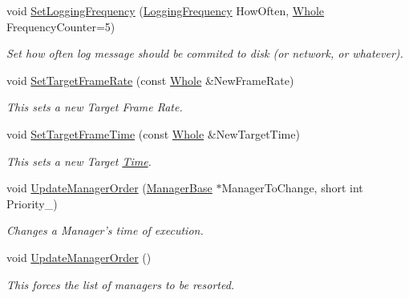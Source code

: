 \begin{DoxyCompactItemize}
void \hyperlink{classMezzanine_1_1World_a6622e9bf41f2bf7fc046745018c05554}{SetLoggingFrequency} (\hyperlink{classMezzanine_1_1World_a535c832832bbdebcdc623c3472a32e25}{LoggingFrequency} HowOften, \hyperlink{namespaceMezzanine_adcbb6ce6d1eb4379d109e51171e2e493}{Whole} FrequencyCounter=5)
\begin{DoxyCompactList}\small\item\em Set how often log message should be commited to disk (or network, or whatever). \item\end{DoxyCompactList}\item 
void \hyperlink{classMezzanine_1_1World_a799427ea004a3954d8d1c30b2537e691}{SetTargetFrameRate} (const \hyperlink{namespaceMezzanine_adcbb6ce6d1eb4379d109e51171e2e493}{Whole} \&NewFrameRate)
\begin{DoxyCompactList}\small\item\em This sets a new Target Frame Rate. \item\end{DoxyCompactList}\item 
void \hyperlink{classMezzanine_1_1World_afd7ea23e2108a1ddd0407e77110f35a0}{SetTargetFrameTime} (const \hyperlink{namespaceMezzanine_adcbb6ce6d1eb4379d109e51171e2e493}{Whole} \&NewTargetTime)
\begin{DoxyCompactList}\small\item\em This sets a new Target \hyperlink{structMezzanine_1_1Time}{Time}. \item\end{DoxyCompactList}\item 
void \hyperlink{classMezzanine_1_1World_a13b4ca08c4e7764232de0d1b3053a6a5}{UpdateManagerOrder} (\hyperlink{classMezzanine_1_1ManagerBase}{ManagerBase} $\ast$ManagerToChange, short int Priority\_\-)
\begin{DoxyCompactList}\small\item\em Changes a Manager's time of execution. \item\end{DoxyCompactList}\item 
void \hyperlink{classMezzanine_1_1World_ab134ca0bf6b75572409a3ebf20ac2e6b}{UpdateManagerOrder} ()
\begin{DoxyCompactList}\small\item\em This forces the list of managers to be resorted. \item\end{DoxyCompactList}\end{DoxyCompactItemize}
